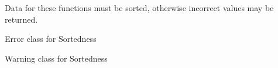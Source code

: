 \documentclass[letterpaper,10pt,english]{sphinxmanual}
\begin{document}
\sphinxAtStartPar
Data for these functions must be sorted, otherwise incorrect values may be
returned.

\begin{fulllineitems}
\label{\detokenize{bisection:GeoSpatialTools.neighbours.SortedError}}
\pysigstartsignatures
\pysigline
{}
\pysigstopsignatures
\sphinxAtStartPar
Error class for Sortedness

\end{fulllineitems}


\begin{fulllineitems}
\label{\detokenize{bisection:GeoSpatialTools.neighbours.SortedWarning}}
\pysigstartsignatures
\pysigline
{}
\pysigstopsignatures
\sphinxAtStartPar
Warning class for Sortedness

\end{fulllineitems}

\end{document}
